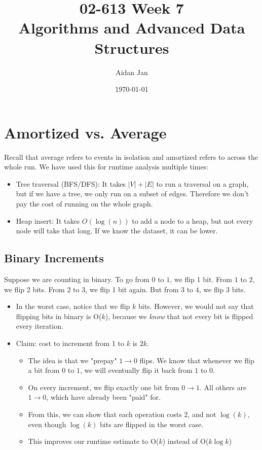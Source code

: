 \documentclass[10pt]{article}
\title{02-613 Week 7 \\ \large{Algorithms and Advanced Data Structures}}
\author{Aidan Jan}
\date{\today}
\begin{document}
\maketitle

\section*{Amortized vs. Average}
Recall that average refers to events in isolation and amortized refers to across the whole run.  We have used this for runtime analysis multiple times:
\begin{itemize}
    \item Tree traversal (BFS/DFS): It takes $|V| + |E|$ to run a traversal on a graph, but if we have a tree, we only run on a subset of edges.  Therefore we don't pay the cost of running on the whole graph.
    \item Heap insert: It takes $O(\log(n))$ to add a node to a heap, but not every node will take that long.  If we know the dataset, it can be lower.
\end{itemize}

\subsection*{Binary Increments}
Suppose we are counting in binary.  To go from $0$ to $1$, we flip 1 bit.  From $1$ to $2$, we flip 2 bits.  From $2$ to $3$, we flip 1 bit again.  But from $3$ to $4$, we flip 3 bits.
\begin{itemize}
    \item In the worst case, notice that we flip $k$ bits.  However, we would not say that flipping bits in binary is O($k$), because we \textit{know} that not every bit is flipped every iteration.
    \item Claim: cost to increment from 1 to $k$ is $2k$.
    \begin{itemize}
        \item The idea is that we "prepay" $1 \rightarrow 0$ flips.  We know that whenever we flip a bit from $0$ to $1$, we will eventually flip it back from $1$ to $0$.
        \item On every increment, we flip exactly one bit from $0 \rightarrow 1$.  All others are $1 \rightarrow 0$, which have already been "paid" for.
        \item From this, we can show that each operation costs $2$, and not $\log(k)$, even though $\log(k)$ bits are flipped in the worst case.
        \item This improves our runtime estimate to O($k$) instead of O($k \log k$)
    \end{itemize}
\end{itemize}
\end{document}
